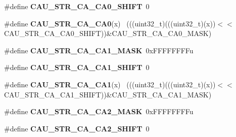 \begin{DoxyCompactItemize}
\item 
\hypertarget{group___c_a_u___register___masks_ga80d0808b0ed4fd4b825e2409ecc79ce7}{}\#define {\bfseries C\+A\+U\+\_\+\+S\+T\+R\+\_\+\+C\+A\+\_\+\+C\+A0\+\_\+\+S\+H\+I\+F\+T}~0\label{group___c_a_u___register___masks_ga80d0808b0ed4fd4b825e2409ecc79ce7}

\item 
\hypertarget{group___c_a_u___register___masks_ga5b217be8a87e400248398383a158ca40}{}\#define {\bfseries C\+A\+U\+\_\+\+S\+T\+R\+\_\+\+C\+A\+\_\+\+C\+A0}(x)                                            ~(((uint32\+\_\+t)(((uint32\+\_\+t)(x))$<$$<$C\+A\+U\+\_\+\+S\+T\+R\+\_\+\+C\+A\+\_\+\+C\+A0\+\_\+\+S\+H\+I\+F\+T))\&C\+A\+U\+\_\+\+S\+T\+R\+\_\+\+C\+A\+\_\+\+C\+A0\+\_\+\+M\+A\+S\+K)\label{group___c_a_u___register___masks_ga5b217be8a87e400248398383a158ca40}

\item 
\hypertarget{group___c_a_u___register___masks_gaf5468a65fe021f5053a4d9fa83c77614}{}\#define {\bfseries C\+A\+U\+\_\+\+S\+T\+R\+\_\+\+C\+A\+\_\+\+C\+A1\+\_\+\+M\+A\+S\+K}~0x\+F\+F\+F\+F\+F\+F\+F\+Fu\label{group___c_a_u___register___masks_gaf5468a65fe021f5053a4d9fa83c77614}

\item 
\hypertarget{group___c_a_u___register___masks_gaf733a0f562c8ff07f24843f2971c85ed}{}\#define {\bfseries C\+A\+U\+\_\+\+S\+T\+R\+\_\+\+C\+A\+\_\+\+C\+A1\+\_\+\+S\+H\+I\+F\+T}~0\label{group___c_a_u___register___masks_gaf733a0f562c8ff07f24843f2971c85ed}

\item 
\hypertarget{group___c_a_u___register___masks_gaef7d0f2273eae5d892d1ee67470284b1}{}\#define {\bfseries C\+A\+U\+\_\+\+S\+T\+R\+\_\+\+C\+A\+\_\+\+C\+A1}(x)                                            ~(((uint32\+\_\+t)(((uint32\+\_\+t)(x))$<$$<$C\+A\+U\+\_\+\+S\+T\+R\+\_\+\+C\+A\+\_\+\+C\+A1\+\_\+\+S\+H\+I\+F\+T))\&C\+A\+U\+\_\+\+S\+T\+R\+\_\+\+C\+A\+\_\+\+C\+A1\+\_\+\+M\+A\+S\+K)\label{group___c_a_u___register___masks_gaef7d0f2273eae5d892d1ee67470284b1}

\item 
\hypertarget{group___c_a_u___register___masks_ga7a41f2c437556c9a48ed99cd8607a9f9}{}\#define {\bfseries C\+A\+U\+\_\+\+S\+T\+R\+\_\+\+C\+A\+\_\+\+C\+A2\+\_\+\+M\+A\+S\+K}~0x\+F\+F\+F\+F\+F\+F\+F\+Fu\label{group___c_a_u___register___masks_ga7a41f2c437556c9a48ed99cd8607a9f9}

\item 
\hypertarget{group___c_a_u___register___masks_gad603664f3d10bcbd341a2d244c0822f5}{}\#define {\bfseries C\+A\+U\+\_\+\+S\+T\+R\+\_\+\+C\+A\+\_\+\+C\+A2\+\_\+\+S\+H\+I\+F\+T}~0\label{group___c_a_u___register___masks_gad603664f3d10bcbd341a2d244c0822f5}


\end{DoxyCompactItemize}
